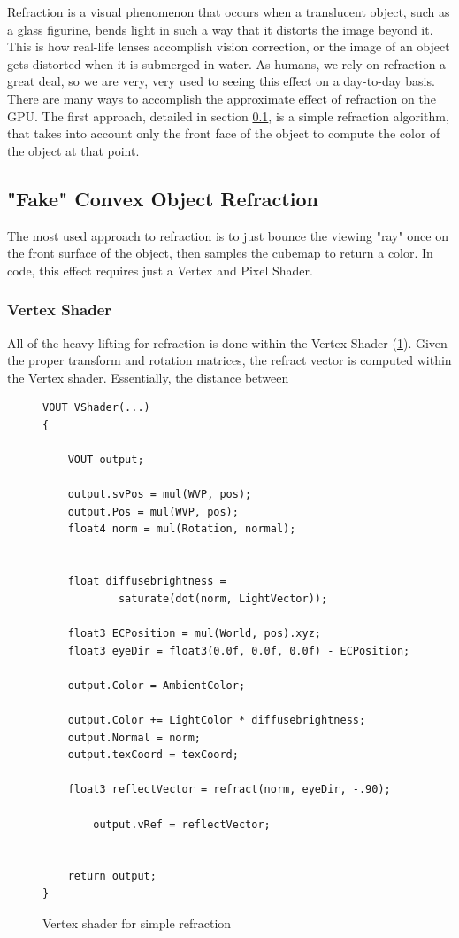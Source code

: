 \documentclass[a4paper, 12pt]{article}
\begin{document}
Refraction is a visual phenomenon that occurs when a translucent object, such
as a glass figurine, bends light in such a way that it distorts the image
beyond it. This is how real-life lenses accomplish vision correction, or the
image of an object gets distorted when it is submerged in water. As humans, we
rely on refraction a great deal, so we are very, very used to seeing this
effect on a day-to-day basis. There are many ways to accomplish the
approximate effect of refraction on the GPU. The first approach, detailed in
section \ref{section:SimpleRefract}, is a simple refraction algorithm, that
takes into account only the front face of the object to compute the color of
the object at that point.

\pagebreak

\subsection{"Fake" Convex Object Refraction}
\label{section:SimpleRefract}

The most used approach to refraction is to just bounce the viewing "ray" once
on the front surface of the object, then samples the cubemap to return a
color. In code, this effect requires just a Vertex and Pixel Shader.

\subsubsection{Vertex Shader}

All of the heavy-lifting for refraction is done within the Vertex Shader
(\ref{code:VSSimpleRefract}). Given the proper transform and rotation
matrices, the refract vector is computed within the Vertex shader.
Essentially, the distance between

\begin{figure}[h]
\begin{lstlisting}[breaklines=true,language=HLSL]
VOUT VShader(...)
{

	VOUT output;

	output.svPos = mul(WVP, pos);
	output.Pos = mul(WVP, pos);
	float4 norm = mul(Rotation, normal);


	float diffusebrightness = 
			saturate(dot(norm, LightVector));

	float3 ECPosition = mul(World, pos).xyz;
	float3 eyeDir = float3(0.0f, 0.0f, 0.0f) - ECPosition;
	
	output.Color = AmbientColor;

	output.Color += LightColor * diffusebrightness;
	output.Normal = norm;
	output.texCoord = texCoord;

	float3 reflectVector = refract(norm, eyeDir, -.90);

		output.vRef = reflectVector;


	return output;
}
\end{lstlisting}

\caption{Vertex shader for simple refraction}
\label{code:VSSimpleRefract}
\end{figure}
\end{document}
